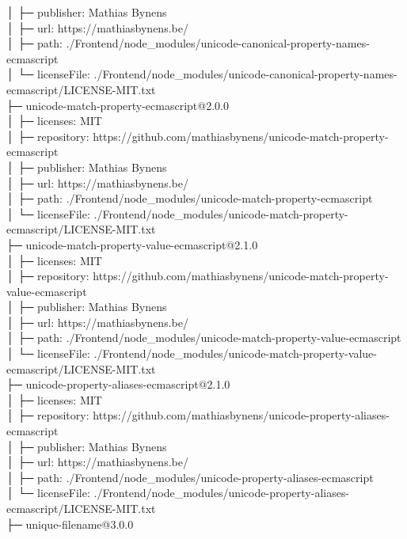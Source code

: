 \documentclass[
    paper=a4,
    twoside=false,
    parskip=half,
    listof=entryprefix,
    listof=totoc,
    index=totoc,
    bibliography=totoc,
    headsepline,
]{scrbook}
\begin{document}
    │  ├─ publisher: Mathias Bynens\\
    │  ├─ url: https://mathiasbynens.be/\\
    │  ├─ path: ./Frontend/node\_modules/unicode-canonical-property-names-ecmascript\\
    │  └─ licenseFile: ./Frontend/node\_modules/unicode-canonical-property-names-ecmascript/LICENSE-MIT.txt\\
    ├─ unicode-match-property-ecmascript@2.0.0\\
    │  ├─ licenses: MIT\\
    │  ├─ repository: https://github.com/mathiasbynens/unicode-match-property-ecmascript\\
    │  ├─ publisher: Mathias Bynens\\
    │  ├─ url: https://mathiasbynens.be/\\
    │  ├─ path: ./Frontend/node\_modules/unicode-match-property-ecmascript\\
    │  └─ licenseFile: ./Frontend/node\_modules/unicode-match-property-ecmascript/LICENSE-MIT.txt\\
    ├─ unicode-match-property-value-ecmascript@2.1.0\\
    │  ├─ licenses: MIT\\
    │  ├─ repository: https://github.com/mathiasbynens/unicode-match-property-value-ecmascript\\
    │  ├─ publisher: Mathias Bynens\\
    │  ├─ url: https://mathiasbynens.be/\\
    │  ├─ path: ./Frontend/node\_modules/unicode-match-property-value-ecmascript\\
    │  └─ licenseFile: ./Frontend/node\_modules/unicode-match-property-value-ecmascript/LICENSE-MIT.txt\\
    ├─ unicode-property-aliases-ecmascript@2.1.0\\
    │  ├─ licenses: MIT\\
    │  ├─ repository: https://github.com/mathiasbynens/unicode-property-aliases-ecmascript\\
    │  ├─ publisher: Mathias Bynens\\
    │  ├─ url: https://mathiasbynens.be/\\
    │  ├─ path: ./Frontend/node\_modules/unicode-property-aliases-ecmascript\\
    │  └─ licenseFile: ./Frontend/node\_modules/unicode-property-aliases-ecmascript/LICENSE-MIT.txt\\
    ├─ unique-filename@3.0.0\\
\end{document}

